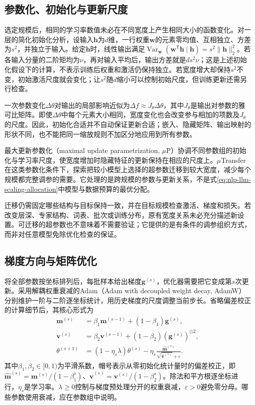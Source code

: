 \subsection{参数化、初始化与更新尺度}
\label{sec:nlp-llm-parameter-scale}

选定规模后，相同的学习率数值未必在不同宽度上产生相同大小的函数变化。对一层的简化初始化分析，设输入$\bm h$为$d$维，一行权重$\bm w$的元素零均值、互相独立、方差为$s^2$，并独立于输入。给定$\bm h$时，线性输出满足$\operatorname{Var}_{\bm w}(\bm w^{\mathsf T}\bm h\mid\bm h)=s^2\lVert\bm h\rVert_2^2$。若各输入分量的二阶矩均为$\nu$，再对输入平均后，输出方差就是$ds^2\nu$；这是上述初始化假设下的计算，不表示训练后权重和激活仍保持独立。若宽度增大却保持$s^2$不变，初始激活尺度就会变化；让$s^2$随$d$缩小可以控制初始尺度，但训练更新还需另行检查。

一次参数变化$\Delta\theta$对输出的局部影响近似为$\Delta f\approx J_\theta\Delta\theta$，其中$J_\theta$是输出对参数的雅可比矩阵。即使$\Delta\theta$中每个元素大小相同，宽度变化也会改变参与相加的项数及$J_\theta$的尺度。因此，初始化合适并不自动保证更新合适；嵌入、隐藏矩阵、输出映射的形状不同，也不能把同一缩放规则不加区分地应用到所有参数。

最大更新参数化（maximal update parametrization, $\mu$P）协调不同参数组的初始化与学习率尺度，使宽度增加时隐藏特征的更新保持在相应的尺度上。$\mu$Transfer在这类参数化条件下，探索把较小模型上选择的超参数迁移到较大宽度，减少每个规模都完整调参的需要。它处理的是跨规模的参数与更新关系，不是式\eqref{eq:nlp-llm-scaling-allocation}中模型与数据预算的最优分配。

迁移仍需固定哪些结构与目标保持一致，并在目标规模检查激活、梯度和损失。若改变层深、专家结构、词表、批次或训练分布，原有宽度关系未必充分描述新设置。可迁移的超参数也不意味着不需要验证；它提供的是有条件的调参组织方式，而非对任意模型免除优化检查的保证。

\subsection{梯度方向与矩阵优化}
\label{sec:nlp-llm-optimizer}

将全部参数按坐标排列后，每批样本给出梯度$\bm g^{(s)}$，优化器需要把它变成第$s$次更新。采用解耦权重衰减的Adam（Adam with decoupled weight decay, AdamW）分别维护一阶与二阶逐坐标统计，用历史梯度的尺度调整当前步长。省略偏差校正的计算细节后，其核心形式为
\begin{align}
 \bm m^{(s)}&=\beta_1\bm m^{(s-1)}+(1-\beta_1)\bm g^{(s)},\\
 \bm v^{(s)}&=\beta_2\bm v^{(s-1)}+(1-\beta_2)(\bm g^{(s)})^{\odot2},\\
 \theta^{(s+1)}&=(1-\eta_s\lambda)\theta^{(s)}
  -\eta_s\frac{\widehat{\bm m}^{(s)}}
  {\sqrt{\widehat{\bm v}^{(s)}}+\varepsilon}.
 \label{eq:nlp-llm-adamw}
\end{align}
其中$\beta_1,\beta_2\in[0,1)$为平滑系数，帽号表示从零初始化统计量时的偏差校正，即$\widehat{\bm m}^{(s)}=\bm m^{(s)}/(1-\beta_1^s)$、$\widehat{\bm v}^{(s)}=\bm v^{(s)}/(1-\beta_2^s)$。除法和平方根逐坐标进行，$\eta_s$是学习率。$\lambda\geq0$控制与梯度预处理分开的权重衰减，$\varepsilon>0$避免零分母。哪些参数使用衰减，应在参数组中说明。

